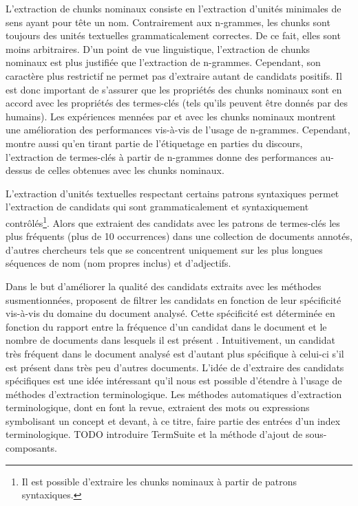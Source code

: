     L'extraction de chunks nominaux consiste en l'extraction d'unités minimales
    de sens ayant pour tête un nom. Contrairement aux n-grammes, les chunks sont
    toujours des unités textuelles grammaticalement correctes. De ce fait, elles
    sont moins arbitraires. D'un point de vue linguistique, l'extraction de
    chunks nominaux est plus justifiée que l'extraction de n-grammes. Cependant,
    son caractère plus restrictif ne permet pas d'extraire autant de candidats
    positifs. Il est donc important de s'assurer que les propriétés des chunks
    nominaux sont en accord avec les propriétés des termes-clés (tels qu'ils
    peuvent être donnés par des humains). Les expériences mennées par
     et  avec les
    chunks nominaux montrent une amélioration des performances vis-à-vis de
    l'usage de n-grammes. Cependant,  montre
    aussi qu'en tirant partie de l'étiquetage en parties du discours,
    l'extraction de termes-clés à partir de n-grammes donne des performances
    au-dessus de celles obtenues avec les chunks nominaux.

    L'extraction d'unités textuelles respectant certains patrons syntaxiques
    permet l'extraction de candidats qui sont grammaticalement et syntaxiquement
    contrôlés\footnote{Il est possible d'extraire les
    chunks nominaux à partir de patrons syntaxiques.}. Alors que
     extraient des candidats avec les
    patrons de termes-clés les plus fréquents (plus de 10 occurrences) dans une
    collection de documents annotés, d'autres chercheurs tels que
     se concentrent uniquement sur les plus longues
    séquences de nom (nom propres inclus) et d'adjectifs.

    Dans le but d'améliorer la qualité des candidats extraits avec les méthodes
    susmentionnées,  proposent de filtrer les
    candidats en fonction de leur spécificité vis-à-vis du domaine du document
    analysé. Cette spécificité est déterminée en fonction du rapport entre la
    fréquence d'un candidat dans le document et le nombre de documents dans
    lesquels il est présent \cite[TF-IDF]{jones1972tfidf}. Intuitivement, un
    candidat très fréquent dans le document analysé est d'autant plus spécifique
    à celui-ci s'il est présent dans très peu d'autres documents. L'idée de
     d'extraire des candidats spécifiques est une
    idée intéressant qu'il nous est possible d'étendre à l'usage de méthodes
    d'extraction terminologique. Les méthodes automatiques d'extraction
    terminologique, dont  en font
    la revue, extraient des mots ou expressions symbolisant un concept et
    devant, à ce titre, faire partie des entrées d'un index terminologique.
    TODO introduire TermSuite et la méthode d'ajout de sous-composants.

